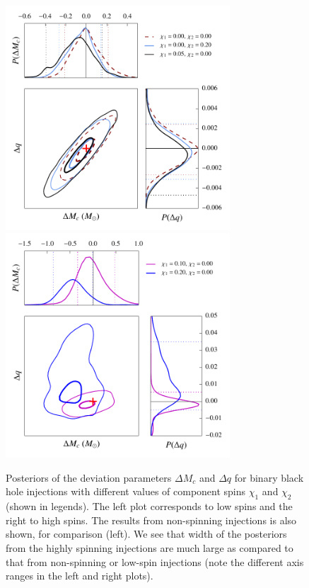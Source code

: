 \documentclass[prd,preprintnumbers,twocolumn,eqsecnum,floatfix,a4paper,nofootinbib,superscriptaddress]{revtex4}
\begin{document}
\begin{figure}[tbh] 
\begin{center}
\includegraphics[width=3.3in]{figs/M_80_q_4_sur_phenom_diffchi.pdf}
\includegraphics[width=3.3in]{figs/M_80_q_4_sur_phenom_diffchi_high_chi_eff.pdf}
\end{center} 
\caption{Posteriors of the deviation parameters $\Delta M_c$ and $\Delta q$ for binary black hole injections with different values of component spins $\chi_1$ and $\chi_2$ (shown in legends). The left plot corresponds to low spins and the right to high spins. The results from non-spinning injections is also shown, for comparison (left). We see that width of the posteriors from the highly spinning injections are much large as compared to that from non-spinning or low-spin injections (note the different axis ranges in the left and right plots).} 
\label{fig:posterior_spin}
\end{figure}
\end{document}
